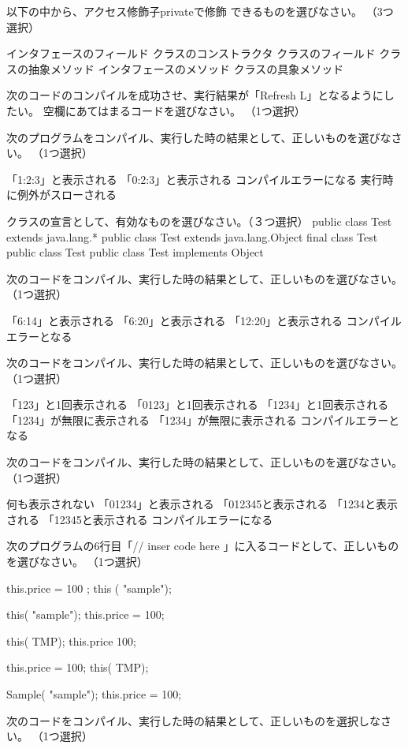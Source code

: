 \documentclass[12pt]{jarticle}
\begin{document}
以下の中から、アクセス修飾子privateで修飾
できるものを選びなさい。
（3つ選択）

インタフェースのフィールド
クラスのコンストラクタ
クラスのフィールド
クラスの抽象メソッド
インタフェースのメソッド
クラスの具象メソッド

次のコードのコンパイルを成功させ、実行結果が「Refresh L」となるようにしたい。
空欄にあてはまるコードを選びなさい。
（1つ選択）





次のプログラムをコンパイル、実行した時の結果として、正しいものを選びなさい。
（1つ選択）


「1:2:3」と表示される
「0:2:3」と表示される
コンパイルエラーになる
実行時に例外がスローされる

クラスの宣言として、有効なものを選びなさい。（３つ選択）
public class Test extends java.lang.* { }
public class Test extends java.lang.Object{}
final class Test{}
public class Test{}
public class Test implements Object{}

次のコードをコンパイル、実行した時の結果として、正しいものを選びなさい。
（1つ選択）


「6:14」と表示される
「6:20」と表示される
「12:20」と表示される
コンパイルエラーとなる


次のコードをコンパイル、実行した時の結果として、正しいものを選びなさい。（1つ選択）

「123」と1回表示される
「0123」と1回表示される
「1234」と1回表示される
「1234」が無限に表示される
「1234」が無限に表示される
コンパイルエラーとなる


次のコードをコンパイル、実行した時の結果として、正しいものを選びなさい。（1つ選択）


何も表示されない
「01234」と表示される
「012345と表示される
「1234と表示される
「12345と表示される
コンパイルエラーになる


次のプログラムの6行目「// inser code here 」に入るコードとして、正しいものを選びなさい。
（1つ選択）


this.price = 100 ;
this ( "sample");

this( "sample");
this.price = 100;

this( TMP);
this.price  100;

this.price = 100;
this( TMP);

Sample( "sample");
this.price = 100;


次のコードをコンパイル、実行した時の結果として、正しいものを選択しなさい。
（1つ選択）

\end{document}
